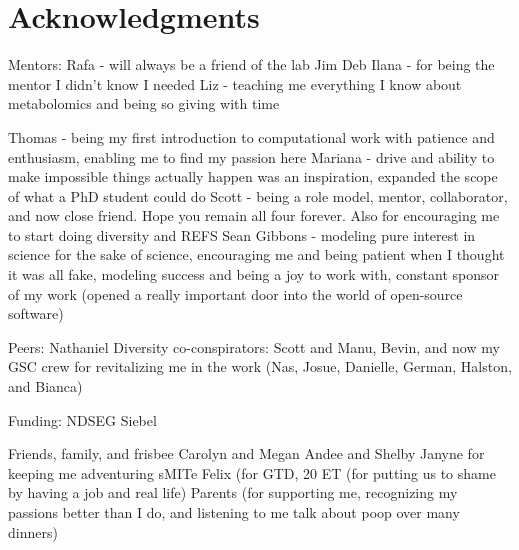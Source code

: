 \section*{Acknowledgments}

Mentors:
Rafa - will always be a friend of the lab
Jim
Deb
Ilana - for being the mentor I didn't know I needed
Liz - teaching me everything I know about metabolomics and being so giving with time

Thomas - being my first introduction to computational work with patience and enthusiasm, enabling me to find my passion here
Mariana - drive and ability to make impossible things actually happen was an inspiration, expanded the scope of what a PhD student could do
Scott - being a role model, mentor, collaborator, and now close friend. Hope you remain all four forever. Also for encouraging me to start doing diversity and REFS
Sean Gibbons - modeling pure interest in science for the sake of science, encouraging me and being patient when I thought it was all fake, modeling success and being a joy to work with, constant sponsor of my work (opened a really important door into the world of open-source software)

Peers:
Nathaniel
Diversity co-conspirators: Scott and Manu, Bevin, and now my GSC crew for revitalizing me in the work (Nas, Josue, Danielle, German, Halston, and Bianca)

Funding:
NDSEG
Siebel

Friends, family, and frisbee
Carolyn and Megan
Andee and Shelby
Janyne for keeping me adventuring
sMITe
Felix (for GTD, 20%
ET (for putting us to shame by having a job and real life)
Parents (for supporting me, recognizing my passions better than I do, and listening to me talk about poop over many dinners)

